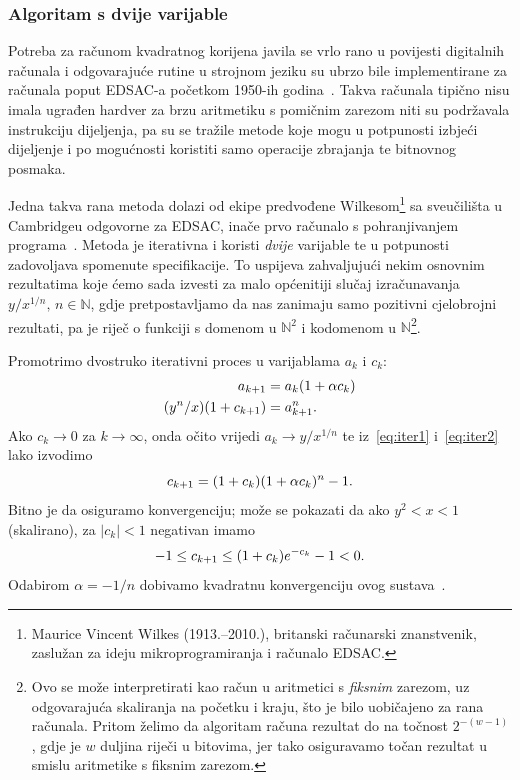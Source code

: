 \documentclass[12pt]{scrartcl}
\begin{document}
\subsubsection{Algoritam s dvije varijable}
Potreba za računom kvadratnog korijena javila se vrlo rano u povijesti digitalnih računala i odgovarajuće rutine u strojnom jeziku
su ubrzo bile implementirane za računala poput EDSAC-a početkom 1950-ih godina~\cite{gower}. Takva računala tipično nisu imala ugrađen
hardver za brzu aritmetiku s pomičnim zarezom niti su podržavala instrukciju dijeljenja, pa su se tražile metode koje mogu u potpunosti
izbjeći dijeljenje i po mogućnosti koristiti samo operacije zbrajanja te bitnovnog posmaka.

Jedna takva rana metoda dolazi od ekipe predvođene Wilkesom\footnote{Maurice
Vincent Wilkes (1913.--2010.), britanski računarski znanstvenik, zaslužan za ideju mikroprogramiranja i računalo EDSAC.}
sa sveučilišta u Cambridgeu odgovorne za EDSAC,
inače prvo računalo s pohranjivanjem programa~\cite[str.~32]{ribaric}. Metoda je iterativna i koristi \emph{dvije} varijable te 
u potpunosti zadovoljava spomenute specifikacije. To uspijeva zahvaljujući nekim osnovnim rezultatima koje ćemo sada izvesti za
malo općenitiji slučaj izračunavanja $y/x^{1/n},\,n\in\mathbb{N}$, gdje pretpostavljamo da nas zanimaju samo pozitivni cjelobrojni rezultati, pa
je riječ o funkciji s domenom u $\mathbb{N}^2$ i kodomenom u $\mathbb N$\footnote{Ovo se može interpretirati kao račun u aritmetici
s \emph{fiksnim} zarezom, uz odgovarajuća skaliranja na početku i kraju, što je bilo uobičajeno za rana računala. Pritom želimo da algoritam
računa rezultat do na točnost $2^{-(w-1)}$, gdje je $w$ duljina riječi u bitovima, jer tako osiguravamo točan rezultat u smislu aritmetike
s fiksnim zarezom.}.

Promotrimo dvostruko iterativni proces u varijablama $a_k$ i $c_k$:
\begin{align}
        a_{k+1} &= a_k(1 + \alpha c_k)\label{eq:iter1}\\
        (y^n / x)(1 + c_{k+1}) &= a^n_{k+1}\label{eq:iter2}\text.
\end{align}
Ako $c_k\to 0$ za $k\to\infty$, onda očito vrijedi $a_k\to y/x^{1/n}$ te iz~\eqref{eq:iter1} i~\eqref{eq:iter2} lako izvodimo
\begin{equation}
    c_{k+1} = (1+c_k)(1+\alpha c_k)^n - 1\text.
\end{equation}
Bitno je da osiguramo konvergenciju; može se pokazati da ako $y^2<x<1$ (skalirano), za $|c_k|<1$ negativan imamo
\begin{equation}\label{eq:edsacscale}
    -1\leq c_{k+1}\leq(1+c_k)e^{-c_k}-1<0\text.
\end{equation}
Odabirom $\alpha=-1/n$ dobivamo kvadratnu konvergenciju ovog sustava~\cite{gower}.
\end{document}
